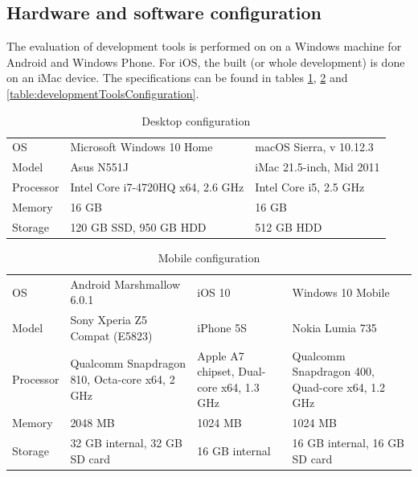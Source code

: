\documentclass[english,master,public,dept460,male,cpdeclaration,oneside]{diploma}
\begin{document}
\subsection{Hardware and software configuration}
The evaluation of development tools is performed on on a Windows machine for Android and Windows Phone. For iOS, the built (or whole development) is done on an iMac device. The specifications can be found in tables \ref{table:desktopConfiguration}, \ref{table:mobileConfiguration} and \ref{table:developmentToolsConfiguration}.

\begin{table}[!h]
	\centering
	\caption{Desktop configuration}
	\label{table:desktopConfiguration}
	\begin{tabular}{p{2cm} | p{4.5cm} p{4.5cm}}
		\toprule
		OS & Microsoft Windows 10 Home & macOS Sierra, v 10.12.3 \\
		Model & Asus N551J & iMac 21.5-inch, Mid 2011 \\
		Processor & Intel Core i7-4720HQ x64, 2.6 GHz & Intel Core i5, 2.5 GHz \\
		Memory & 16 GB & 16 GB \\
		Storage & 120 GB SSD, 950 GB HDD & 512 GB HDD \\
		\midrule
	\end{tabular}
\end{table}

\begin{table}[!h]
	\centering
	\caption{Mobile configuration}
	\label{table:mobileConfiguration}
	\begin{tabular}{p{2cm} | p{3.5cm} p{3.5cm} p{3.5cm}}
		\toprule
		OS & Android Marshmallow 6.0.1 & iOS 10 & Windows 10 Mobile \\
		Model & Sony Xperia Z5 Compat (E5823) & iPhone 5S & Nokia Lumia 735 \\
		Processor & Qualcomm Snapdragon 810, Octa-core x64, 2 GHz & Apple A7 chipset, Dual-core x64, 1.3 GHz & Qualcomm Snapdragon 400, Quad-core x64, 1.2 GHz \\
		Memory & 2048 MB & 1024 MB & 1024 MB \\
		Storage & 32 GB internal, 32 GB SD card & 16 GB internal & 16 GB internal, 16 GB SD card \\
		\midrule
	\end{tabular}
\end{table}
\end{document}
